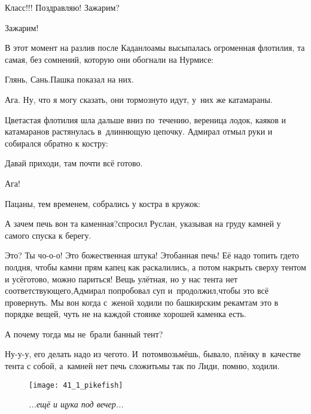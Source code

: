 \diagdash Класс!!! Поздравляю! Зажарим?

\diagdash Зажарим!

В этот момент на разлив после Каданлоамы высыпалась огроменная флотилия, та самая, без сомнений, которую они обогнали на Нурмисе:

\diagdash Глянь, Сань.\mdash Пашка показал на них.

\diagdash Ага. Ну, что я могу сказать, они тормознуто идут, у~них же катамараны.

Цветастая флотилия шла дальше вниз по~течению, вереница лодок, каяков и катамаранов растянулась в~длиннющую цепочку. Адмирал отмыл руки и собирался обратно к костру:

\diagdash Давай приходи, там почти всё готово.

\diagdash Ага!

Пацаны, тем временем, собрались у костра в кружок:

\diagdash А зачем печь вон та каменная?\mdash спросил Руслан, указывая на груду камней у самого спуска к берегу.

\diagdash Это? Ты чо-о-о! Это божественная штука! Это\mdash банная печь! Её надо топить где\sdash то полдня, чтобы камни прям капец как раскалились, а потом накрыть сверху тентом и усё\mdash готово, можно париться! Вещь улётная, но у нас тента нет соответствующего,\mdash Адмирал попробовал суп и~продолжил,\mdash чтобы это всё провернуть. Мы вон когда с~женой ходили по башкирским рекам\mdash там это в порядке вещей, чуть не на каждой стоянке хорошей каменка есть.

%
\diagdash А почему тогда мы не~брали банный тент?

\diagdash Ну-у-у, его делать надо из чего\sdash то. И~потом\mdash возьмёшь, бывало, плёнку в~качестве тента с собой, а~камней нет печь сложить\mdash мы так по Лиди, помню, ходили. 

\begin{figure}[h]
	\centering
	\texttt{[image: 41\_1\_pikefish]}
	\caption{\small\textit{...ещё и щука под вечер...}}
\end{figure}

